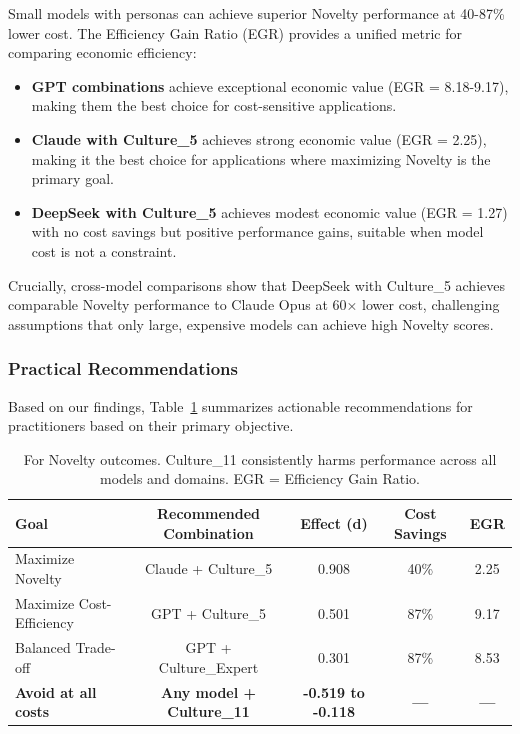 \documentclass{article}
\begin{document}
Small models with personas can achieve superior Novelty performance at 40-87\% lower cost. The Efficiency Gain Ratio (EGR) provides a unified metric for comparing economic efficiency:

\begin{itemize}
    \item \textbf{GPT combinations} achieve exceptional economic value (EGR = 8.18-9.17), making them the best choice for cost-sensitive applications.
    \item \textbf{Claude with Culture\_5} achieves strong economic value (EGR = 2.25), making it the best choice for applications where maximizing Novelty is the primary goal.
    \item \textbf{DeepSeek with Culture\_5} achieves modest economic value (EGR = 1.27) with no cost savings but positive performance gains, suitable when model cost is not a constraint.
\end{itemize}

Crucially, cross-model comparisons show that DeepSeek with Culture\_5 achieves comparable Novelty performance to Claude Opus at 60× lower cost, challenging assumptions that only large, expensive models can achieve high Novelty scores.

\subsubsection{Practical Recommendations}

Based on our findings, Table~\ref{tab:practical_recommendations} summarizes actionable recommendations for practitioners based on their primary objective.

\begin{table}[H]
\centering
\caption{Practical Recommendations for Persona Selection}
\label{tab:practical_recommendations}
\begin{tabular}{lcccc}
\toprule
\textbf{Goal} & \textbf{Recommended Combination} & \textbf{Effect (d)} & \textbf{Cost Savings} & \textbf{EGR} \\
\midrule
Maximize Novelty & Claude + Culture\_5 & 0.908 & 40\% & 2.25 \\
Maximize Cost-Efficiency & GPT + Culture\_5 & 0.501 & 87\% & 9.17 \\
Balanced Trade-off & GPT + Culture\_Expert & 0.301 & 87\% & 8.53 \\
\midrule
\textbf{Avoid at all costs} & \textbf{Any model + Culture\_11} & \textbf{-0.519 to -0.118} & \textbf{---} & \textbf{---} \\
\bottomrule
\end{tabular}
\caption*{\footnotesize For Novelty outcomes. Culture\_11 consistently harms performance across all models and domains. EGR = Efficiency Gain Ratio.}
\end{table}
\end{document}
